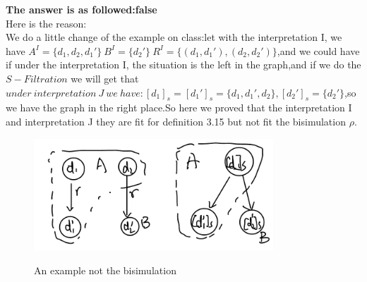 \documentclass{article}
\begin{document}
    \textbf{The answer is as followed:false}\\
    Here is the reason:\\
    We do a little change of the example on class:let with the interpretation I, we have $A^I = \{d_1, d_2 ,d_1'\} \ B^I = \{d_2'\} \ R^I = \{(d_1,d_1'), (d_2, d_2')\}$,and we could have 
    if under the interpretation I, the situation is the left in the graph,and if we do the $S-Filtration$ we will get that $under \ interpretation \ J \ we \ have :[d_1]_s = [d_1']_s = \{d_1, d_1', d_2\}, [d_2']_s = \{d_2'\}$,so we have the graph 
    in the right place.So here we proved that the interpretation I and interpretation J they are fit for definition 3.15 but not fit the bisimulation $\rho$.\\
    \begin{figure}[H]
        \centering
        \includegraphics[width=0.8\textwidth]{2.png}\\
        \caption{An example not the bisimulation}
        \label{fig:bisimulation}
    \end{figure}  
\end{document}
